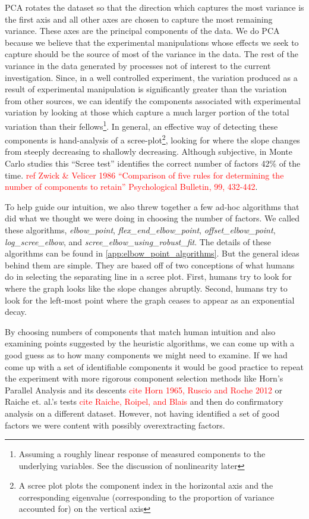 \documentclass[10pt,letterpaper]{book}
\newcommand{\todo}[1]{\textcolor{red}{#1}}
\newcommand{\filename}[1]{\textit{#1}}
\begin{document}
PCA rotates the dataset so that the direction which captures the most variance is the first axis and all other axes are chosen to capture the most remaining variance. These axes are the principal components of the data. We do PCA because we believe that the experimental manipulations whose effects we seek to capture should be the source of most of the variance in the data. The rest of the variance in the data generated by processes not of interest to the current investigation. Since, in a well controlled experiment, the variation produced as a result of experimental manipulation is significantly greater than the variation from other sources, we can identify the components associated with experimental variation by looking at those which capture a much larger portion of the total variation than their fellows\footnote{Assuming a roughly linear response of measured components to the underlying variables. See the discussion of nonlinearity later}. In general, an effective way of detecting these components is hand-analysis of a scree-plot\footnote{A scree plot plots the component index in the horizontal axis and the corresponding eigenvalue (corresponding to the proportion of variance accounted for) on the vertical axis}, looking for where the slope changes from steeply decreasing to shallowly decreasing. Although subjective, in Monte Carlo studies this ``Scree test'' identifies the correct number of factors 42\% of the time. \todo{ref Zwick \& Velicer 1986 ``Comparison of five 
rules for determining the number of components to retain'' Psychological Bulletin, 99, 432-442}. 

To help guide our intuition, we also threw together a few ad-hoc algorithms that did what we thought we were doing in choosing the number of factors. We called these algorithms, \filename{elbow\_point}, \filename{flex\_end\_elbow\_point}, \filename{offset\_elbow\_point}, \filename{log\_scree\_elbow}, and \filename{scree\_elbow\_using\_robust\_fit}. The details of these algorithms can be found in \ref{app:elbow_point_algorithms}. But the general ideas behind them are simple. They are based off of two conceptions of what humans do in selecting the separating line in a scree plot. First, humans try to look for where the graph looks like the slope changes abruptly. Second, humans try to look for the left-most point where the graph ceases to appear as an exponential decay.

By choosing numbers of components that match human intuition and also examining points suggested by the heuristic algorithms, we can come up with a good guess as to how many components we might need to examine. If we had come up with a set of identifiable components it would be good practice to repeat the experiment with more rigorous component selection methods like Horn's Parallel Analysis and its descents \todo{cite Horn 1965, Ruscio and Roche 2012} or Raiche et. al.'s tests \todo{cite Raiche, Roipel, and Blais} and then do confirmatory analysis on a different dataset. However, not having identified a set of good factors we were content with possibly overextracting factors.
\end{document}

